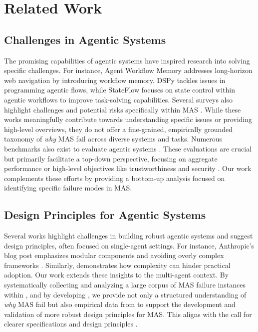 \section{Related Work}
\label{sec:related}

\subsection{Challenges in Agentic Systems}
\label{sec:related_challenges_in_mas}
The promising capabilities of agentic systems have inspired research into solving specific challenges. For instance, Agent Workflow Memory \cite{wang2024agentworkflowmemory} addresses long-horizon web navigation by introducing workflow memory. DSPy \cite{khattab2023dspycompilingdeclarativelanguage} tackles issues in programming agentic flows, while StateFlow \cite{wu2024stateflowenhancingllmtasksolving} focuses on state control within agentic workflows to improve task-solving capabilities. Several surveys also highlight challenges and potential risks specifically within MAS \cite{han2024llmmultiagentsystemschallenges, hammond2025multiagentrisksadvancedai}. While these works meaningfully contribute towards understanding specific issues or providing high-level overviews, they do not offer a fine-grained, empirically grounded taxonomy of \textit{why} MAS fail across diverse systems and tasks. Numerous benchmarks also exist to evaluate agentic systems \cite{jimenez2024swebench, peng2024survey, wang2024battleagentbench, anne2024harnessing, bettini2024benchmarl, long2024teamcraft}. These evaluations are crucial but primarily facilitate a top-down perspective, focusing on aggregate performance or high-level objectives like trustworthiness and security \cite{liu2023trustworthy, yao2024survey}. Our work complements these efforts by providing a bottom-up analysis focused on identifying specific failure modes in MAS.

\subsection{Design Principles for Agentic Systems}
Several works highlight challenges in building robust agentic systems and suggest design principles, often focused on single-agent settings. For instance, Anthropic's blog post emphasizes modular components and avoiding overly complex frameworks \cite{Anthropic_2024}. Similarly, \citet{kapoor2024aiagentsmatter} demonstrates how complexity can hinder practical adoption. Our work extends these insights to the multi-agent context. By systematically collecting and analyzing a large corpus of MAS failure instances within \dataset{}, and by developing \taxonomy{}, we provide not only a structured understanding of \textit{why} MAS fail but also empirical data from \dataset{} to support the development and validation of more robust design principles for MAS. This aligns with the call for clearer specifications and design principles \cite{stoica2024specifications}.

